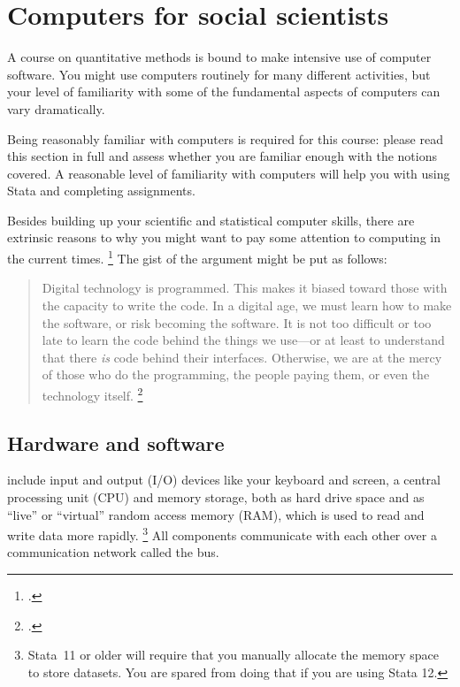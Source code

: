 %
%

\chapter{Computers for social scientists}%
  \label{ch:computers}%

A course on quantitative methods is bound to make intensive use of computer software. You might use computers routinely for many different activities, but your level of familiarity with some of the fundamental aspects of computers can vary dramatically.%

Being reasonably familiar with computers is required for this course: please read this section in full and assess whether you are familiar enough with the notions covered. A reasonable level of familiarity with computers will help you with using Stata and completing assignments.%

Besides building up your scientific and statistical computer skills, there are extrinsic reasons to why you might want to pay some attention to computing in the current times.%
  \footcite{Doctorow:2011} %
  The gist of the argument might be put as follows: %

\begin{quote}%
Digital technology is programmed. This makes it biased toward those with the capacity to write the code. In a digital age, we must learn how to make the software, or risk becoming the software. It is not too difficult or too late to learn the code behind the things we use—or at least to understand that there \emph{is} code behind their interfaces. Otherwise, we are at the mercy of those who do the programming, the people paying them, or even the technology itself.%
\footcite[p.~128]{Rushkoff:2010}%
\end{quote}

%
\section{Hardware and software}%

 include input and output (I/O) devices like your keyboard and screen, a central processing unit (CPU) and memory storage, both as hard drive space and as ``live'' or ``virtual'' random access memory (RAM), which is used to read and write data more rapidly.%
  \footnote{Stata~11 or older will require that you manually allocate the memory space to store datasets. You are spared from doing that if you are using Stata 12.} %
  All components communicate with each other over a communication network called the bus.%

